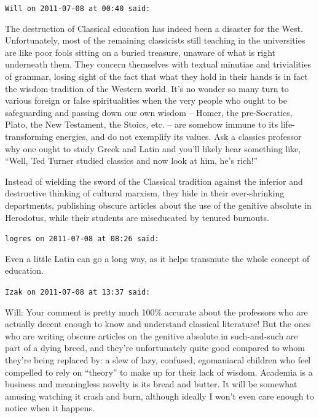 \begin{footnotesize}
\begin{sffamily}
\texttt{Will on 2011-07-08 at 00:40 said:}

The destruction of Classical education has indeed been a disaster for the West. Unfortunately, most of the remaining classicists still teaching in the universities are like poor fools sitting on a buried treasure, unaware of what is right underneath them. They concern themselves with textual minutiae and trivialities of grammar, losing sight of the fact that what they hold in their hands is in fact the wisdom tradition of the Western world. It's no wonder so many turn to various foreign or false spiritualities when the very people who ought to be safeguarding and passing down our own wisdom -- Homer, the pre-Socratics, Plato, the New Testament, the Stoics, etc. -- are somehow immune to its life-transforming energies, and do not exemplify its values. Ask a classics professor why one ought to study Greek and Latin and you'll likely hear something like, ``Well, Ted Turner studied classics and now look at him, he's rich!''

Instead of wielding the sword of the Classical tradition against the inferior and destructive thinking of cultural marxism, they hide in their ever-shrinking departments, publishing obscure articles about the use of the genitive absolute in Herodotus, while their students are miseducated by tenured burnouts.

\hfill

\texttt{logres on 2011-07-08 at 08:26 said:}

Even a little Latin can go a long way, as it helps transmute the whole concept of education.

\hfill

\texttt{Izak on 2011-07-08 at 13:37 said:}

Will: Your comment is pretty much 100\% accurate about the professors who are actually decent enough to know and understand classical literature! But the ones who are writing obscure articles on the genitive absolute in such-and-such are part of a dying breed, and they're unfortunately quite good compared to whom they're being replaced by: a slew of lazy, confused, egomaniacal children who feel compelled to rely on ``theory'' to make up for their lack of wisdom. Academia is a business and meaningless novelty is its bread and butter. It will be somewhat amusing watching it crash and burn, although ideally I won't even care enough to notice when it happens.


\hfill

\end{sffamily}
\end{footnotesize}

